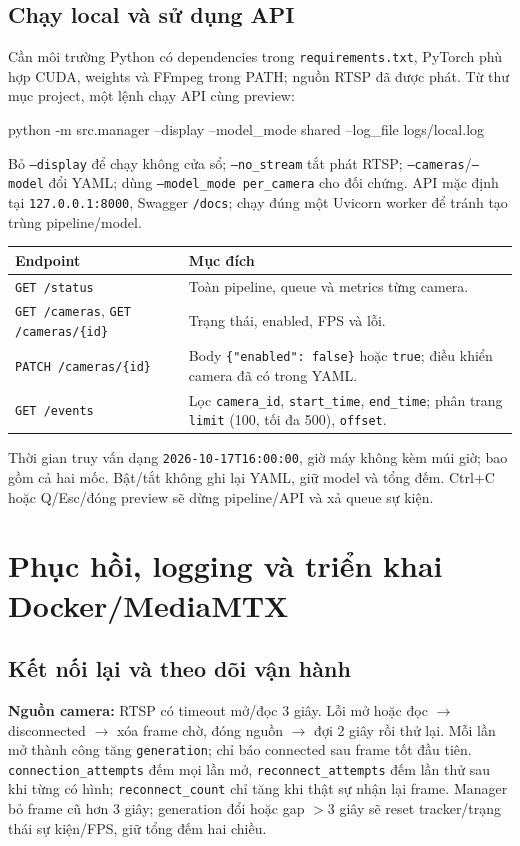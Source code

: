 \documentclass[10pt,a4paper]{article}
\begin{document}
\subsection*{Chạy local và sử dụng API}
Cần môi trường Python có dependencies trong \texttt{requirements.txt},
PyTorch phù hợp CUDA, weights và FFmpeg trong PATH; nguồn RTSP đã được phát.
Từ thư mục project, một lệnh chạy API cùng preview:
\begin{Code}
python -m src.manager --display --model_mode shared --log_file logs/local.log
\end{Code}
Bỏ \texttt{--display} để chạy không cửa sổ; \texttt{--no\_stream} tắt phát RTSP;
\texttt{--cameras}/\texttt{--model} đổi YAML; dùng
\texttt{--model\_mode per\_camera} cho đối chứng.
API mặc định tại \texttt{127.0.0.1:8000}, Swagger \texttt{/docs};
chạy đúng một Uvicorn worker để tránh tạo trùng pipeline/model.

\begin{tabularx}{\linewidth}{@{}p{6cm}Y@{}}
\toprule
\textbf{Endpoint} & \textbf{Mục đích}\\
\midrule
\texttt{GET /status} & Toàn pipeline, queue và metrics từng camera.\\
\texttt{GET /cameras}, \texttt{GET /cameras/\{id\}} & Trạng thái,
enabled, FPS và lỗi.\\
\texttt{PATCH /cameras/\{id\}} & Body \texttt{\{"enabled": false\}} hoặc
\texttt{true}; điều khiển camera đã có trong YAML.\\
\texttt{GET /events} & Lọc \texttt{camera\_id}, \texttt{start\_time},
\texttt{end\_time}; phân trang \texttt{limit} (100, tối đa 500), \texttt{offset}.\\
\bottomrule
\end{tabularx}
Thời gian truy vấn dạng \texttt{2026-10-17T16:00:00}, giờ máy không kèm múi giờ;
bao gồm cả hai mốc. Bật/tắt không ghi lại YAML, giữ model và tổng đếm.
Ctrl+C hoặc Q/Esc/đóng preview sẽ dừng pipeline/API và xả queue sự kiện.

\newpage
\section{Phục hồi, logging và triển khai Docker/MediaMTX}
\subsection*{Kết nối lại và theo dõi vận hành}
\textbf{Nguồn camera:} RTSP có timeout mở/đọc 3 giây. Lỗi mở hoặc đọc
$\to$ disconnected $\to$ xóa frame chờ, đóng nguồn $\to$ đợi 2 giây rồi thử lại.
Mỗi lần mở thành công tăng \texttt{generation}; chỉ báo connected sau frame tốt
đầu tiên. \texttt{connection\_attempts} đếm mọi lần mở,
\texttt{reconnect\_attempts} đếm lần thử sau khi từng có hình;
\texttt{reconnect\_count} chỉ tăng khi thật sự nhận lại frame.
Manager bỏ frame cũ hơn 3 giây; generation đổi hoặc gap $>3$ giây sẽ reset
tracker/trạng thái sự kiện/FPS, giữ tổng đếm hai chiều.
\end{document}
